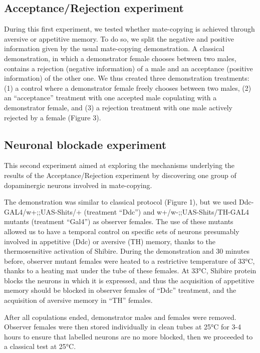 \documentclass[a4paper, 12pt]{article}
\begin{document}
	\subsection{Acceptance/Rejection experiment}
	
	During this first experiment, we tested whether mate-copying is achieved through aversive or appetitive memory. To do so, we split the negative and positive information given by the usual mate-copying demonstration. A classical demonstration, in which a demonstrator female chooses between two males, contains a rejection (negative information) of a male and an acceptance (positive information) of the other one. We thus created three demonstration treatments: (1) a control where a demonstrator female freely chooses between two males, (2) an “acceptance” treatment with one accepted male copulating with a demonstrator female, and (3) a rejection treatment with one male actively rejected by a female (Figure 3).
	
	\subsection{Neuronal blockade experiment}
	
	This second experiment aimed at exploring the mechanisms underlying the results of the Acceptance/Rejection experiment by discovering one group of dopaminergic neurons involved in mate-copying.
	
	The demonstration was similar to classical protocol (Figure 1), but we used Ddc-GAL4/w+;;UAS-Shits/+ (treatment “Ddc”) and w+/w-;;UAS-Shits/TH-GAL4 mutants (treatment “Gal4”) as observer females. The use of these mutants allowed us to have a temporal control on specific sets of neurons presumably involved in appetitive (Ddc) or aversive (TH) memory, thanks to the thermosensitive activation of Shibire. During the demonstration and 30 minutes before, observer mutant females were heated to a restrictive temperature of 33°C, thanks to a heating mat under the tube of these females. At 33°C, Shibire protein blocks the neurons in which it is expressed, and thus the acquisition of appetitive memory should be blocked in observer females of “Ddc” treatment, and the acquisition of aversive memory in “TH” females. 
	
	After all copulations ended, demonstrator males and females were removed. Observer females were then stored individually in clean tubes at 25°C for 3-4 hours to ensure that labelled neurons are no more blocked, then we proceeded to a classical test at 25°C.
\end{document}
